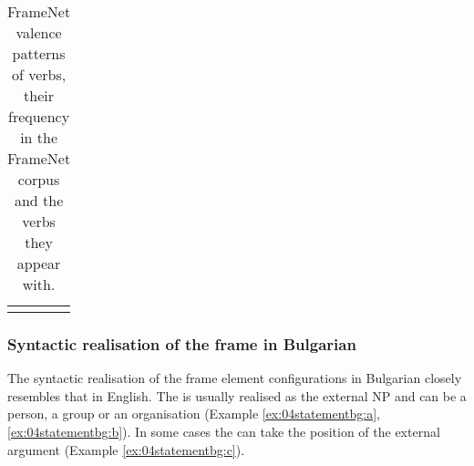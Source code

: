 \documentclass[output=paper,colorlinks,citecolor=brown]{langscibook}
\begin{document}
\begin{table}[t]
\begin{tabularx}{\textwidth}{ lrQ }
\lspbottomrule
    \end{tabularx}
    \caption{FrameNet valence patterns of  verbs, their frequency in the FrameNet corpus and the verbs they appear with.}
    \label{tbl:statement-valence}
\end{table} 


\subsubsection{Syntactic realisation of the  frame in Bulgarian}
\largerpage
The syntactic realisation of the frame element configurations in Bulgarian closely resembles that in English. The  is usually realised as the external NP and can be a person, a group or an organisation (Example \ref{ex:04statementbg:a}, \ref{ex:04statementbg:b}). In some cases the  can take the position of the external argument (Example \ref{ex:04statementbg:c}). 
\end{document}

